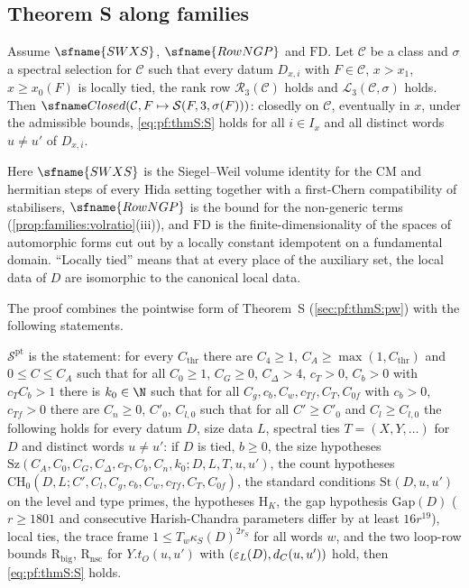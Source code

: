 \subsection{Theorem S along families}\label{sec:pf:thmS:fam}

\begin{theorem}\label{pf:thmS:main}
Assume $\sfname{SWXS}$, $\sfname{RowNGP}$ and $\mathrm{FD}$. Let $\mathcal C$ be a class and $\sigma$ a
spectral selection for $\mathcal C$ such that every datum $D_{x,i}$ with $F\in\mathcal C$, $x>x_1$, $x\ge x_0(F)$ is
locally tied, the rank row $\mathcal{R}_{3}(\mathcal C)$ holds and $\mathcal{L}_{3}(\mathcal C,\sigma)$
holds. Then $\thmSClosed(\mathcal C,F\mapsto\mathcal{S}(F,3,\sigma(F)))$: closedly on $\mathcal C$,
eventually in $x$, under the admissible bounds, \eqref{eq:pf:thmS:S} holds for all $i\in I_x$ and all distinct
words $u\ne u'$ of $D_{x,i}$.
\end{theorem}

Here $\sfname{SWXS}$ is the Siegel--Weil volume identity for the CM and hermitian steps of every Hida setting together
with a first-Chern compatibility of stabilisers, $\sfname{RowNGP}$ is the bound for the non-generic terms
(\cref{prop:families:volratio}(iii)), and $\mathrm{FD}$ is the finite-dimensionality of the spaces of
automorphic forms cut out by a locally constant idempotent on a fundamental domain. ``Locally tied'' means that at
every place of the auxiliary set, the local data of $D$ are isomorphic to the canonical local data.

The proof combines the pointwise form of Theorem~S (\cref{sec:pf:thmS:pw}) with the following statements.

\begin{definition}\label{pf:thmS:distinct}
$\mathcal{S}^{\mathrm{pt}}$ is the statement: for every $C_{\mathrm{thr}}$ there are $C_4\ge1$,
$C_A\ge\max(1,C_{\mathrm{thr}})$ and $0\le C\le C_A$ such that for all $C_0\ge1$, $C_G\ge0$, $C_\Delta>4$, $c_T>0$,
$C_b>0$ with $c_TC_b>1$ there is $k_0\in\N$ such that for all $C_g,c_b,C_w,c_{Tf},C_T,C_{0f}$ with $c_b>0$, $c_{Tf}>0$
there are $C_n\ge0$, $C'_0$, $C_{l,0}$ such that for all $C'\ge C'_0$ and $C_l\ge C_{l,0}$ the following holds for
every datum $D$, size data $L$, spectral ties $T=(X,Y,\dots)$ for $D$ and distinct words $u\ne u'$: if $D$ is tied,
$b\ge0$, the size hypotheses $\mathrm{Sz}(C_A,C_0,C_G,C_\Delta,c_T,C_b,C_n,k_0;D,L,T,u,u')$, the count
hypotheses $\mathrm{CH}_0(D,L;C',C_l,C_g,c_b,C_w,c_{Tf},C_T,C_{0f})$, the standard conditions
$\mathrm{St}(D,u,u')$ on the level and type primes, the hypotheses $\mathrm{H}_{K}$, the gap hypothesis
$\mathrm{Gap}(D)$ ($r\ge1801$ and consecutive Harish-Chandra parameters differ by at least $16r^{19}$), local ties,
the trace frame $1\le T_w\kappa_S(D)^{2r_S}$ for all words $w$, and the two loop-row bounds $\mathrm{R}_{\mathrm{big}}$,
$\mathrm{R}_{\mathrm{nsc}}$ for $Y.t_O(u,u')$ with $(\varepsilon_{L}(D),d_{C}(u,u'))$ hold, then \eqref{eq:pf:thmS:S} holds.
\end{definition}


